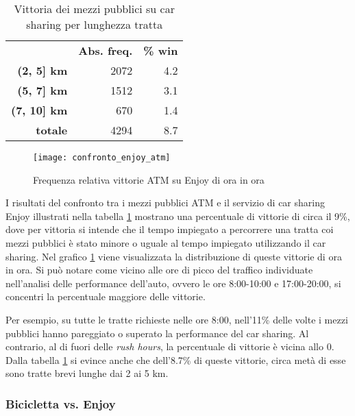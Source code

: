 \begin{table}[H]
	\centering

	\begin{tabular}{ | r r r | }
		\hline
		& \textbf{Abs. freq.} & \textbf{\% win} \\
		\textbf{(2, 5] km} & 2072 & 4.2 \\
		\textbf{(5, 7] km} & 1512 & 3.1 \\
		\textbf{(7, 10] km} & 670 & 1.4 \\
		\hline
		\textbf{totale} & 4294 & 8.7 \\
		\hline
	\end{tabular}

	\caption{Vittoria dei mezzi pubblici su car sharing per lunghezza tratta}
	\label{table:5}
\end{table}

\begin{figure}[H]
	\texttt{[image: confronto\_enjoy\_atm]}
	\caption{Frequenza relativa vittorie ATM su Enjoy di ora in ora}
	\label{image:10}
\end{figure}

I risultati del confronto tra i mezzi pubblici ATM e il servizio di car sharing Enjoy illustrati nella tabella \ref{table:5} mostrano una percentuale di vittorie di circa il 9\%, dove per vittoria si intende che il tempo impiegato a percorrere una tratta coi mezzi pubblici è stato minore o uguale al tempo impiegato utilizzando il car sharing. Nel grafico \ref{image:10} viene visualizzata la distribuzione di queste vittorie di ora in ora. Si può notare come vicino alle ore di picco del traffico individuate nell'analisi delle performance dell'auto, ovvero le ore 8:00-10:00 e 17:00-20:00, si concentri la percentuale maggiore delle vittorie.

Per esempio, su tutte le tratte richieste nelle ore 8:00, nell'11\% delle volte i mezzi pubblici hanno pareggiato o superato la performance del car sharing. Al contrario, al di fuori delle \textit{rush hours}, la percentuale di vittorie è vicina allo 0. Dalla tabella \ref{table:5} si evince anche che dell'8.7\% di queste vittorie, circa metà di esse sono tratte brevi lunghe dai 2 ai 5 km.

\subsubsection{Bicicletta vs. Enjoy}

